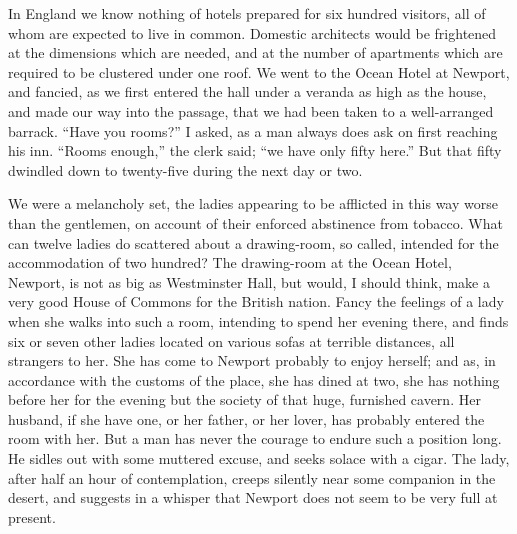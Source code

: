 In England we know nothing of hotels prepared for six hundred
visitors, all of whom are expected to live in common.  Domestic
architects would be frightened at the dimensions which are needed,
and at the number of apartments which are required to be clustered
under one roof.  We went to the Ocean Hotel at Newport, and
fancied, as we first entered the hall under a veranda as high as
the house, and made our way into the passage, that we had been
taken to a well-arranged barrack.  ``Have you rooms?'' I asked, as a
man always does ask on first reaching his inn.  ``Rooms enough,'' the
clerk said; ``we have only fifty here.''  But that fifty dwindled
down to twenty-five during the next day or two.

We were a melancholy set, the ladies appearing to be afflicted in
this way worse than the gentlemen, on account of their enforced
abstinence from tobacco.  What can twelve ladies do scattered about
a drawing-room, so called, intended for the accommodation of two
hundred?  The drawing-room at the Ocean Hotel, Newport, is not as
big as Westminster Hall, but would, I should think, make a very
good House of Commons for the British nation.  Fancy the feelings
of a lady when she walks into such a room, intending to spend her
evening there, and finds six or seven other ladies located on
various sofas at terrible distances, all strangers to her.  She has
come to Newport probably to enjoy herself; and as, in accordance
with the customs of the place, she has dined at two, she has
nothing before her for the evening but the society of that huge,
furnished cavern.  Her husband, if she have one, or her father, or
her lover, has probably entered the room with her.  But a man has
never the courage to endure such a position long.  He sidles out
with some muttered excuse, and seeks solace with a cigar.  The
lady, after half an hour of contemplation, creeps silently near
some companion in the desert, and suggests in a whisper that
Newport does not seem to be very full at present.

